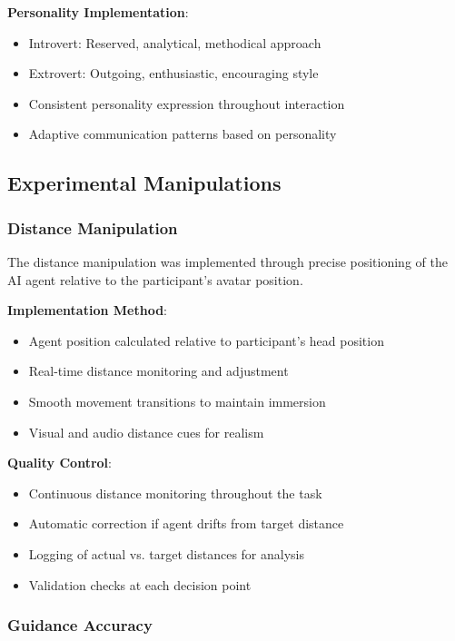 \documentclass[12pt]{article}
\begin{document}
\textbf{Personality Implementation}:
\begin{itemize}
    \item Introvert: Reserved, analytical, methodical approach
    \item Extrovert: Outgoing, enthusiastic, encouraging style
    \item Consistent personality expression throughout interaction
    \item Adaptive communication patterns based on personality
\end{itemize}

\subsection{Experimental Manipulations}

\subsubsection{Distance Manipulation}

The distance manipulation was implemented through precise positioning of the AI agent relative to the participant's avatar position.

\textbf{Implementation Method}:
\begin{itemize}
    \item Agent position calculated relative to participant's head position
    \item Real-time distance monitoring and adjustment
    \item Smooth movement transitions to maintain immersion
    \item Visual and audio distance cues for realism
\end{itemize}

\textbf{Quality Control}:
\begin{itemize}
    \item Continuous distance monitoring throughout the task
    \item Automatic correction if agent drifts from target distance
    \item Logging of actual vs. target distances for analysis
    \item Validation checks at each decision point
\end{itemize}

\subsubsection{Guidance Accuracy}
\end{document}
